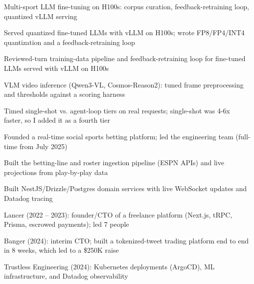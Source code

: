 \documentclass[print]{jack-resume}
\begin{document}
\begin{tightemize}
    \item Multi-sport LLM fine-tuning on H100s: corpus curation, feedback-retraining loop, quantized vLLM serving
    \item Served quantized fine-tuned LLMs with vLLM on H100s; wrote FP8/FP4/INT4 quantization and a feedback-retraining loop
    \item Reviewed-turn training-data pipeline and feedback-retraining loop for fine-tuned LLMs served with vLLM on H100s
    \item VLM video inference (Qwen3-VL, Cosmos-Reason2): tuned frame preprocessing and thresholds against a scoring harness
    \item Timed single-shot vs. agent-loop tiers on real requests; single-shot was 4-6x faster, so I added it as a fourth tier
\end{tightemize}
\sectionsep

\begin{tightemize}
    \item Founded a real-time social sports betting platform; led the engineering team (full-time from July 2025)
    \item Built the betting-line and roster ingestion pipeline (ESPN APIs) and live projections from play-by-play data
    \item Built NestJS/Drizzle/Postgres domain services with live WebSocket updates and Datadog tracing
\end{tightemize}
\sectionsep

\begin{tightemize}
    \item Lancer (2022 -- 2023): founder/CTO of a freelance platform (Next.js, tRPC, Prisma, escrowed payments); led 7 people
    \item Banger (2024): interim CTO; built a tokenized-tweet trading platform end to end in 8 weeks, which led to a \$250K raise
    \item Trustless Engineering (2024): Kubernetes deployments (ArgoCD), ML infrastructure, and Datadog observability
\end{tightemize}
\sectionsep
\end{document}
